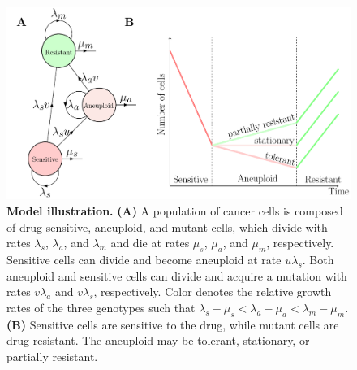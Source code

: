 \documentclass[12pt]{extarticle}
\begin{document}

\begin{figure}
\centering
\includegraphics[width=\textwidth]{Figures/figureAneuploidy.pdf}
\caption{
\textbf{Model illustration.}
\textbf{(A)} A population of cancer cells is composed of drug-sensitive, aneuploid, and mutant cells, which divide with rates $\lambda_s$, $\lambda_a$, and $\lambda_m$ and die at rates $\mu_s$, $\mu_a$, and $\mu_m$, respectively. 
Sensitive cells can divide and become aneuploid at rate $u\lambda_s$. Both aneuploid and sensitive cells can divide and acquire a mutation with rates $v\lambda_a$ and $v\lambda_s$, respectively. Color denotes the relative growth rates of the three genotypes such that $\lambda_s - \mu_s < \lambda_a - \mu_a < \lambda_m - \mu_m$. \textbf{(B)} Sensitive cells are sensitive to the drug, while mutant cells are drug-resistant. The aneuploid may be tolerant, stationary, or partially resistant.
}
\label{figureAneuploidy}
\end{figure}
\end{document}
